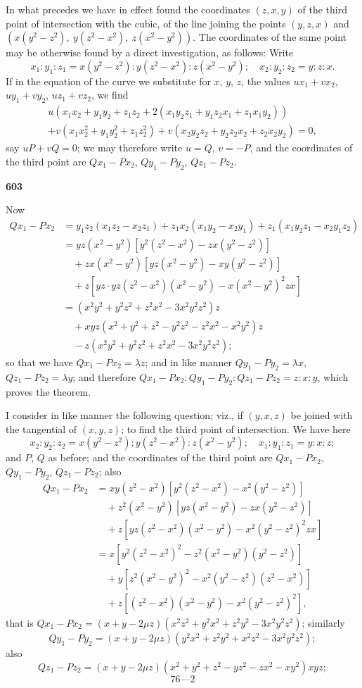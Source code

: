 \documentclass[12pt,a4paper]{article}
\theoremstyle{plain}
\begin{document}
In what precedes we have in effect found the coordinates $(z,x,y)$ of the third point of intersection with the cubic, of the line joining the points $(y,z,x)$ and $(x(y^2-z^2),\ y(z^2-x^2),\ z(x^2-y^2))$. The coordinates of the same point may be otherwise found by a direct investigation, as follows: Write
\[x_1:y_1:z_1 = x(y^2-z^2) : y(z^2-x^2) : z(x^2-y^2);\quad x_2:y_2:z_2 = y:z:x.\]
If in the equation of the curve we substitute for $x$, $y$, $z$, the values $ux_1+vx_2$, $uy_1+vy_2$, $uz_1+vz_2$, we find
\begin{multline*}
u(x_1x_2+y_1y_2+z_1z_2+2(x_1y_2z_1+y_1z_2x_1+z_1x_1y_2)) \\
+ v(x_1x_2^2+y_1y_2^2+z_1z_2^2) + v(x_2y_2z_2+y_2z_2x_2+z_2x_2y_2) = 0,
\end{multline*}
say $uP+vQ=0$; we may therefore write $u=Q$, $v=-P$, and the coordinates of the third point are $Qx_1-Px_2$, $Qy_1-Py_2$, $Qz_1-Pz_2$.

\newpage
\noindent\textbf{603}

Now
\begin{align*}
Qx_1 - Px_2 &= y_1z_2(x_1z_2-x_2z_1) + z_1x_2(x_1y_2-x_2y_1) + z_1(x_1y_2z_1-x_2y_1z_2)\\
&= yz(x^2-y^2)[y^2(z^2-x^2)-zx(y^2-z^2)]\\
&\quad + zx(x^2-y^2)[yz(x^2-y^2)-xy(y^2-z^2)]\\
&\quad + z[yz\cdot yz(z^2-x^2)(x^2-y^2) - x(x^2-y^2)^2 zx]\\
&= (x^2y^2+y^2z^2+z^2x^2-3x^2y^2z^2)z\\
&\quad + xyz(x^2+y^2+z^2-y^2z^2-z^2x^2-x^2y^2)z\\
&\quad - z(x^2y^2+y^2z^2+z^2x^2-3x^2y^2z^2);
\end{align*}
so that we have $Qx_1-Px_2 = \lambda z$; and in like manner $Qy_1-Py_2 = \lambda x$, $Qz_1-Pz_2 = \lambda y$; and therefore $Qx_1-Px_2 : Qy_1-Py_2 : Qz_1-Pz_2 = z:x:y$, which proves the theorem.

I consider in like manner the following question; viz., if $(y,x,z)$ be joined with the tangential of $(x,y,z)$; to find the third point of intersection. We have here
\[x_2:y_2:z_2 = x(y^2-z^2) : y(z^2-x^2) : z(x^2-y^2);\quad x_1:y_1:z_1 = y:x:z;\]
and $P$, $Q$ as before; and the coordinates of the third point are $Qx_1-Px_2$, $Qy_1-Py_2$, $Qz_1-Pz_2$; also
\begin{align*}
Qx_1 - Px_2 &= xy(z^2-x^2)[y^2(z^2-x^2)-x^2(y^2-z^2)]\\
&\quad + z^2(x^2-y^2)[yz(x^2-y^2)-zx(y^2-z^2)]\\
&\quad + z[yz(z^2-x^2)(x^2-y^2)-x^2(y^2-z^2)^2 zx]\\
&= x[y^2(z^2-x^2)^2-z^2(x^2-y^2)(y^2-z^2)]\\
&\quad + y[z^2(x^2-y^2)^2-x^2(y^2-z^2)(z^2-x^2)]\\
&\quad + z[(z^2-x^2)(x^2-y^2)-x^2(y^2-z^2)^2],
\end{align*}
that is $Qx_1-Px_2 = (x+y-2\mu z)(x^2z^2+y^2x^2+z^2y^2-3x^2y^2z^2)$; similarly
\[Qy_1-Py_2 = (x+y-2\mu z)(y^2x^2+z^2y^2+x^2z^2-3x^2y^2z^2);\]
also
\[Qz_1-Pz_2 = (x+y-2\mu z)(x^2+y^2+z^2-yz^2-zx^2-xy^2)xyz;\]
\[76\text{---}2\]
\end{document}
